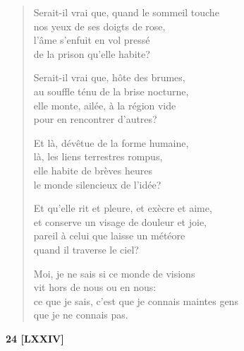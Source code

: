 \begin{verse}
  Serait-il vrai que, quand le sommeil touche \\
  nos yeux de ses doigts de rose, \\
  l'âme s'enfuit en vol pressé \\
  de la prison qu'elle habite?

  Serait-il vrai que, hôte des brumes, \\
  au souffle ténu de la brise nocturne, \\
  elle monte, ailée, à la région vide \\
  pour en rencontrer d'autres?

  Et là, dévêtue de la forme humaine, \\
  là, les liens terrestres rompus, \\
  elle habite de brèves heures \\
  le monde silencieux de l'idée?

  Et qu'elle rit et pleure, et exècre et aime, \\
  et conserve un visage de douleur et joie, \\
  pareil à celui que laisse un météore \\
  quand il traverse le ciel?

  Moi, je ne sais si ce monde de visions \\
  vit hors de nous ou en nous: \\
  ce que je sais, c'est que je connais maintes gens \\
  que je ne connais pas.
\end{verse}

\smallskip

\begin{center}
  \textbf{24 [LXXIV]}
\end{center}


